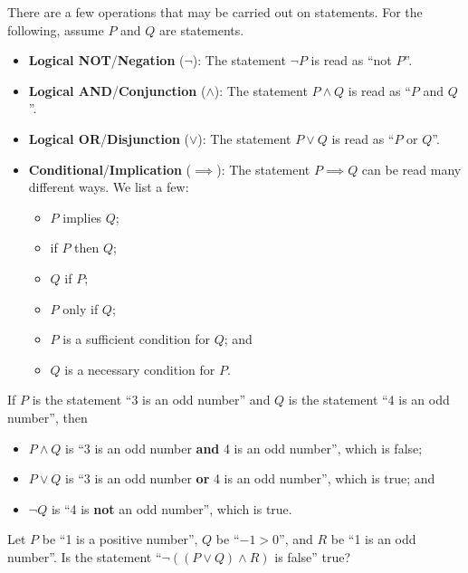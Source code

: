 There are a few operations that may be carried out on statements. For the following, assume $P$ and $Q$ are statements.
\begin{itemize}
    \item \textbf{Logical NOT}/\textbf{Negation} ($\lnot$): The statement $\lnot P$ is read as ``not $P$''.
    \item \textbf{Logical AND}/\textbf{Conjunction} ($\land$): The statement $P\land Q$ is read as ``$P$ and $Q$''.
    \item \textbf{Logical OR}/\textbf{Disjunction} ($\lor$): The statement $P\lor Q$ is read as ``$P$ or $Q$''.
    \item \textbf{Conditional}/\textbf{Implication} ($\implies$): The statement $P \implies Q$ can be read many different ways. We list a few:
    \begin{itemize}
        \item $P$ implies $Q$;
        \item if $P$ then $Q$;
        \item $Q$ if $P$;
        \item $P$ only if $Q$;
        \item $P$ is a sufficient condition for $Q$; and
        \item $Q$ is a necessary condition for $P$.
    \end{itemize}
\end{itemize}
\begin{example}
    If $P$ is the statement ``3 is an odd number'' and $Q$ is the statement ``4 is an odd number'', then
    \begin{itemize}
        \item $P\land Q$ is ``3 is an odd number \textbf{and} 4 is an odd number'', which is false;
        \item $P\lor Q$ is ``3 is an odd number \textbf{or} 4 is an odd number'', which is true; and
        \item $\lnot Q$ is ``4 is \textbf{not} an odd number'', which is true.
    \end{itemize}
\end{example}
\begin{exercise}
    Let $P$ be ``1 is a positive number'', $Q$ be ``$-1 > 0$'', and $R$ be ``1 is an odd number''. Is the statement ``$\lnot((P\lor Q)\land R)$ is false'' true?
\end{exercise}

